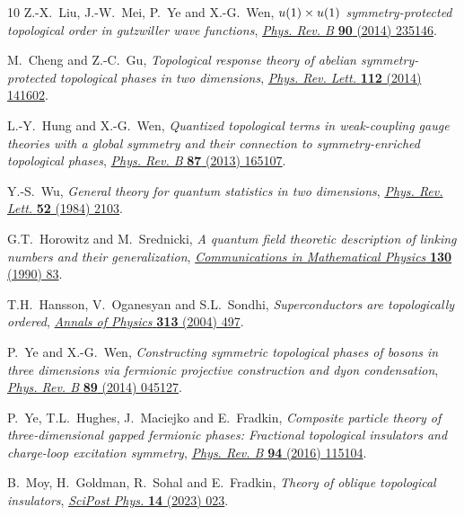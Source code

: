 \documentclass[11pt,nofootinbib,preprint]{revtex4-1}
\begin{document}
\begin{thebibliography}{10}
Z.-X.~Liu, J.-W.~Mei, P.~Ye and X.-G.~Wen,
  \emph{$u(1)\ifmmode\times\else\texttimes\fi{}u(1)$ symmetry-protected
  topological order in gutzwiller wave functions},
  \href{https://doi.org/10.1103/PhysRevB.90.235146}{\emph{Phys. Rev. B}
  {\bfseries 90} (2014) 235146}.

M.~Cheng and Z.-C.~Gu, \emph{Topological response theory of abelian
  symmetry-protected topological phases in two dimensions},
  \href{https://doi.org/10.1103/PhysRevLett.112.141602}{\emph{Phys. Rev. Lett.}
  {\bfseries 112} (2014) 141602}.

L.-Y.~Hung and X.-G.~Wen, \emph{Quantized topological terms in weak-coupling
  gauge theories with a global symmetry and their connection to
  symmetry-enriched topological phases},
  \href{https://doi.org/10.1103/PhysRevB.87.165107}{\emph{Phys. Rev. B}
  {\bfseries 87} (2013) 165107}.

Y.-S.~Wu, \emph{General theory for quantum statistics in two dimensions},
  \href{https://doi.org/10.1103/PhysRevLett.52.2103}{\emph{Phys. Rev. Lett.}
  {\bfseries 52} (1984) 2103}.

G.T.~Horowitz and M.~Srednicki, \emph{A quantum field theoretic description of
  linking numbers and their generalization},
  \href{https://doi.org/10.1007/BF02099875}{\emph{Communications in
  Mathematical Physics} {\bfseries 130} (1990) 83}.

T.H.~Hansson, V.~Oganesyan and S.L.~Sondhi, \emph{Superconductors are
  topologically ordered},
  \href{https://doi.org/http://dx.doi.org/10.1016/j.aop.2004.05.006}{\emph{Annals
  of Physics} {\bfseries 313} (2004) 497}.

P.~Ye and X.-G.~Wen, \emph{Constructing symmetric topological phases of bosons
  in three dimensions via fermionic projective construction and dyon
  condensation}, \href{https://doi.org/10.1103/PhysRevB.89.045127}{\emph{Phys.
  Rev. B} {\bfseries 89} (2014) 045127}.

P.~Ye, T.L.~Hughes, J.~Maciejko and E.~Fradkin, \emph{Composite particle theory
  of three-dimensional gapped fermionic phases: Fractional topological
  insulators and charge-loop excitation symmetry},
  \href{https://doi.org/10.1103/PhysRevB.94.115104}{\emph{Phys. Rev. B}
  {\bfseries 94} (2016) 115104}.

B.~Moy, H.~Goldman, R.~Sohal and E.~Fradkin, \emph{{Theory of oblique
  topological insulators}},
  \href{https://doi.org/10.21468/SciPostPhys.14.2.023}{\emph{SciPost Phys.}
  {\bfseries 14} (2023) 023}.


\end{thebibliography}
\end{document}
